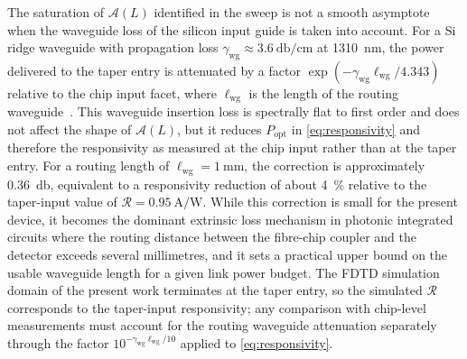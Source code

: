 The saturation of $\mathcal{A}(L)$ identified in the sweep is not a smooth
asymptote when the waveguide loss of the silicon input guide is taken into
account. For a Si ridge waveguide with propagation loss $\gamma_{\mathrm{wg}}
\approx \SI{3.6}{\decibel\per\centi\metre}$ at \SI{1310}{\nano\metre}, the
power delivered to the taper entry is attenuated by a factor
$\exp(-\gamma_{\mathrm{wg}} \ell_{\mathrm{wg}}/4.343)$ relative to the chip
input facet, where $\ell_{\mathrm{wg}}$ is the length of the routing waveguide~\cite{Wang2024}. This waveguide insertion loss is spectrally flat to first
order and does not affect the shape of $\mathcal{A}(L)$, but it reduces
$P_{\mathrm{opt}}$ in \cref{eq:responsivity} and therefore the responsivity
as measured at the chip input rather than at the taper entry. For a routing
length of $\ell_{\mathrm{wg}} = \SI{1}{\milli\metre}$, the correction is
approximately \SI{0.36}{\decibel}, equivalent to a responsivity reduction
of about \SI{4}{\percent} relative to the taper-input value of
$\mathcal{R} = \SI{0.95}{\ampere\per\watt}$. While this correction is small
for the present device, it becomes the dominant extrinsic loss mechanism in
photonic integrated circuits where the routing distance between the fibre-chip
coupler and the detector exceeds several millimetres, and it sets a practical
upper bound on the usable waveguide length for a given link power budget. The
FDTD simulation domain of the present work terminates at the taper entry, so
the simulated $\mathcal{R}$ corresponds to the taper-input responsivity; any
comparison with chip-level measurements must account for the routing waveguide
attenuation separately through the factor $10^{-\gamma_{\mathrm{wg}}
\ell_{\mathrm{wg}}/10}$ applied to \cref{eq:responsivity}.



